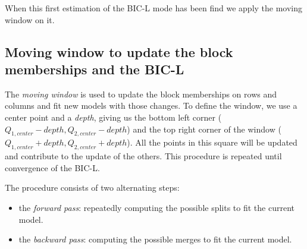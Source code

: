 \documentclass[12pt,a4paper]{report}
\begin{document}
When this first estimation of the BIC-L mode has been find we apply the moving
window on it.
\subsection{Moving window to update the block memberships and the BIC-L}
The \emph{moving window} is used to update the block memberships on rows and 
columns and fit new models with those changes.
To define the window, we use a center point and a \emph{depth}, giving us the 
bottom left corner ($Q_{1,center} - depth, Q_{2,center} - depth$) and the top right corner of the 
window ($Q_{1,center} + depth, Q_{2,center} + depth$). All the points in this square will be 
updated and contribute to the update of the others.
This procedure is repeated until convergence of the BIC-L.

The procedure consists of two alternating steps:
\begin{itemize}
    \item the \emph{forward pass}: repeatedly computing the possible splits to 
    fit the current model.
    \item the \emph{backward pass}: computing the possible merges to fit the current model.
\end{itemize}
\end{document}
